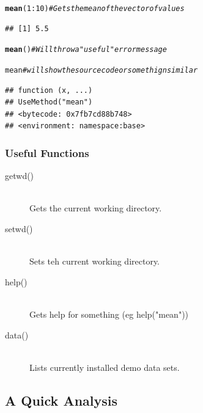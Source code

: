 \documentclass{article}\usepackage[]{graphicx}\usepackage[]{color}
\makeatletter
\newcommand{\hlnum}[1]{\textcolor[rgb]{0.686,0.059,0.569}{#1}}%
\newcommand{\hlcom}[1]{\textcolor[rgb]{0.678,0.584,0.686}{\textit{#1}}}%
\newcommand{\hlopt}[1]{\textcolor[rgb]{0,0,0}{#1}}%
\newcommand{\hlstd}[1]{\textcolor[rgb]{0.345,0.345,0.345}{#1}}%
\newcommand{\hlkwd}[1]{\textcolor[rgb]{0.737,0.353,0.396}{\textbf{#1}}}%
\newenvironment{kframe}{%
 \def\at@end@of@kframe{}%
 \ifinner\ifhmode%
  \def\at@end@of@kframe{\end{minipage}}%
  \begin{minipage}{\columnwidth}%
 \fi\fi%
 \def\FrameCommand##1{\hskip\@totalleftmargin \hskip-\fboxsep
 \colorbox{shadecolor}{##1}\hskip-\fboxsep
     \hskip-\linewidth \hskip-\@totalleftmargin \hskip\columnwidth}%
 \MakeFramed {\advance\hsize-\width
   \@totalleftmargin\z@ \linewidth\hsize
   \@setminipage}}%
 {\par\unskip\endMakeFramed%
 \at@end@of@kframe}
\newenvironment{knitrout}{}{} %
\makeatother
\begin{document}
\begin{knitrout}
\color{fgcolor}\begin{kframe}
\begin{alltt}
    \hlkwd{mean}\hlstd{(}\hlnum{1}\hlopt{:}\hlnum{10}\hlstd{)} \hlcom{# Gets the mean of the vector of values}
\end{alltt}
\begin{verbatim}
## [1] 5.5
\end{verbatim}
\begin{alltt}
    \hlkwd{mean}\hlstd{()} \hlcom{# Will throw a "useful" error message}
\end{alltt}


{\ttfamily\noindent\bfseries{}}\begin{alltt}
    \hlstd{mean} \hlcom{# will show the source code or somethign similar}
\end{alltt}
\begin{verbatim}
## function (x, ...) 
## UseMethod("mean")
## <bytecode: 0x7fb7cd88b748>
## <environment: namespace:base>
\end{verbatim}
\end{kframe}
\end{knitrout}
  
  \subsubsection*{Useful Functions}
    \begin{description}
      \item[getwd()] \hfill \\
      Gets the current working directory.
      \item[setwd()] \hfill \\
      Sets teh current working directory.
      \item[help()] \hfill \\
      Gets help for something (eg help("mean"))
      \item[data()] \hfill \\
      Lists currently installed demo data sets.
    \end{description}
  
  \subsection*{A Quick Analysis}
  
\end{document}
